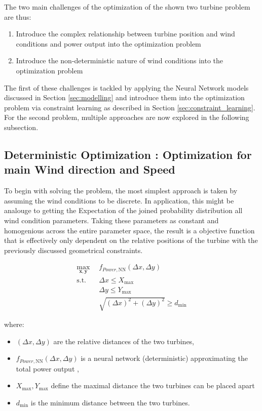 The two main challenges of the optimization of the shown two turbine problem are thus: 

\begin{enumerate}
	\item Introduce the complex relationship between turbine position and wind conditions and power output into the optimization problem
	\item Introduce the non-deterministic nature of wind conditions into the optimization problem
\end{enumerate}

The first of these challenges is tackled by applying the Neural Network models discussed in Section \ref{sec:modelling} and introduce them into the optimization problem via constraint learning as described in Section \ref{sec:constraint_learning}. For the second problem, multiple approaches are now explored in the following subsection.


\subsection{Deterministic Optimization : Optimization for main Wind direction and Speed}

To begin with solving the problem, the most simplest approach is taken by assuming the wind conditions to be discrete. In application, this might be analouge to getting the Expectation of the joined probability distribution all wind condition parameters. Taking these parameters as constant and homogenious across the entire parameter space, the result is a objective function that is effectively only dependent on the relative positions of the turbine with the previously discussed geometrical constraints.

\begin{align}
	\max_{\mathbf{x}, \mathbf{y}} & f_{Power,\text{NN}}(\Delta x, \Delta y) \\
	\text{s.t.} \quad 
	&  \Delta x \leq X_{\max} \\
	&  \Delta y \leq Y_{\max} \\
	& \sqrt{(\Delta x)^2 + (\Delta y)^2} \geq d_{\min}
\end{align}

where:
\begin{itemize}
	\item \( (\Delta x, \Delta y) \) are the relative distances of the two turbines,
	\item \( f_{Power, \text{NN}}(\Delta x, \Delta y)\) is a neural network (deterministic) approximating the total power output ,
	\item \(  X_{\max}, Y_{\max} \) define the maximal distance the two turbines can be placed apart
	\item \( d_{\min} \) is the minimum distance between the two turbines.
\end{itemize}


